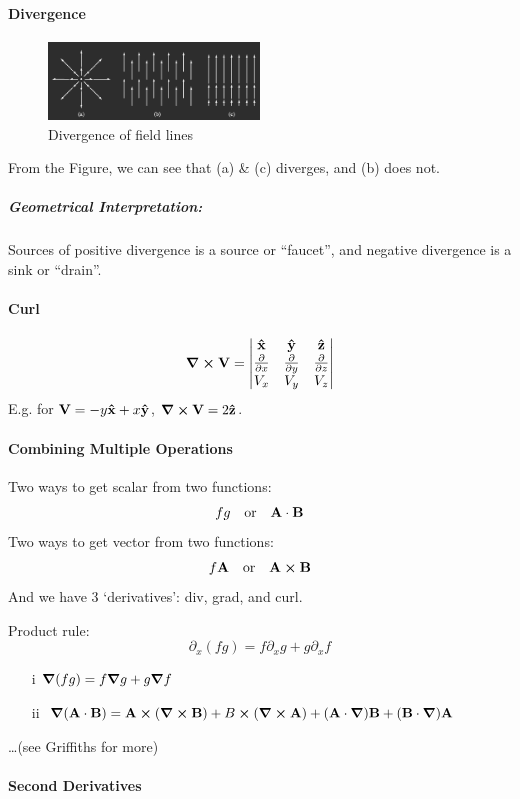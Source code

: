 \documentclass[../main.tex]{subfiles}
\begin{document}
\paragraph*{Divergence}
\begin{figure}[ht]
    \centering
    \includegraphics[width=0.5\textwidth]{fig1.1.png}
    \caption{Divergence of field lines}
\end{figure}
From the Figure, we can see that (a) \& (c) diverges, and (b) does not.
\subparagraph*{Geometrical Interpretation:} Sources of positive divergence is a source or ``faucet'',
and negative divergence is a sink or ``drain''.

\paragraph*{Curl }
\[\curl \vb V = \begin{vmatrix}
    \vu x & \vu y & \vu z \\
    \pdv{x} & \pdv{y} & \pdv{z} \\
    V_x & V_y & V_z
\end{vmatrix}\]
E.g. for $\vb V = -y \vu x + x \vu y$, $\curl \vb V = 2 \vu z$.

\paragraph*{Combining Multiple Operations}
Two ways to get scalar from two functions:
\[fg \qor \vb A \cdot \vb B \]
Two ways to get vector from two functions:
\[f\vb A \qor \vb A \cross \vb B \]
And we have 3 `derivatives': div, grad, and curl.

Product rule: \[\partial_x (fg) = f \partial_x g + g \partial_x f\]

\begin{enumerate}
    \item[i] \(\grad(fg) = f \grad g + g \grad f\)
    \item[ii] \(\grad(\vb A \cdot \vb B) = \vb A \cross (\curl \vb B) + B \cross (\curl \vb A) + (\vb A \cdot \grad) \vb B + (\vb B \cdot \grad) \vb A\)
\end{enumerate}
\dots (see Griffiths for more)
\newpage
{}

\paragraph*{Second Derivatives}
\end{document}
